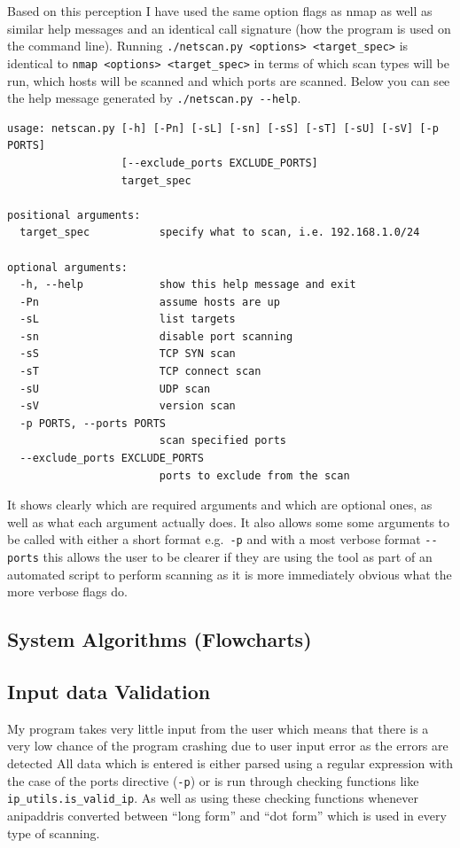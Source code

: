 \documentclass[titlepage]{article}
\let\Oldsubsection\subsection{}
\renewcommand{\subsection}{\FloatBarrier\Oldsubsection}
\begin{document}
Based on this perception I have used the same option flags as nmap as well as similar help messages
and an identical call signature (how the program is used on the command line). Running 
\verb|./netscan.py <options> <target_spec>| is identical to \verb|nmap <options> <target_spec>| in terms
of which scan types will be run, which hosts will be scanned and which \glspl{port} are scanned. Below you can see
the help message generated by \verb|./netscan.py --help|.
\begin{verbatim}
usage: netscan.py [-h] [-Pn] [-sL] [-sn] [-sS] [-sT] [-sU] [-sV] [-p PORTS]
                  [--exclude_ports EXCLUDE_PORTS]
                  target_spec

positional arguments:
  target_spec           specify what to scan, i.e. 192.168.1.0/24

optional arguments:
  -h, --help            show this help message and exit
  -Pn                   assume hosts are up
  -sL                   list targets
  -sn                   disable port scanning
  -sS                   TCP SYN scan
  -sT                   TCP connect scan
  -sU                   UDP scan
  -sV                   version scan
  -p PORTS, --ports PORTS
                        scan specified ports
  --exclude_ports EXCLUDE_PORTS
                        ports to exclude from the scan
\end{verbatim}

It shows clearly which are required arguments and which are optional ones, as well as what
each argument actually does. It also allows some some arguments to be called with either
a short format e.g.\ \verb|-p| and with a most verbose format \verb|--ports| this allows
the user to be clearer if they are using the tool as part of an automated script to perform
scanning as it is more immediately obvious what the more verbose flags do.

\subsection{System Algorithms (Flowcharts)}

\textbf{\color{Emerald}{When I have finished the first draft of the text bits I will add pictures / flowcharts}}

\subsection{Input data Validation}

My program takes very little input from the user which means that there is a very low chance of the program
crashing due to user input error as the errors are detected
All data which is entered is either parsed using a regular expression with the case of the
\glspl{port} directive (\verb|-p|) or is run through checking functions like \verb|ip_utils.is_valid_ip|.
As well as using these checking functions whenever an\gls{ipaddr}is converted between ``long form''
and ``dot form'' which is used in every type of scanning.
\end{document}
